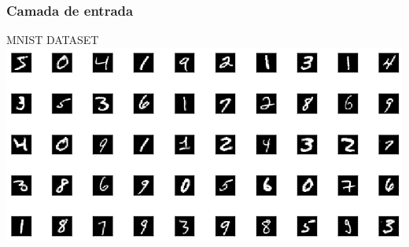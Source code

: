 \documentclass[tikz,10pt]{beamer}
\begin{document}
\begin{frame}
	\frametitle{Camada de entrada}
	\centering
	MNIST DATASET
	\includegraphics[width=.8\paperwidth]{images/fabio/inputs}
\end{frame}
\end{document}
